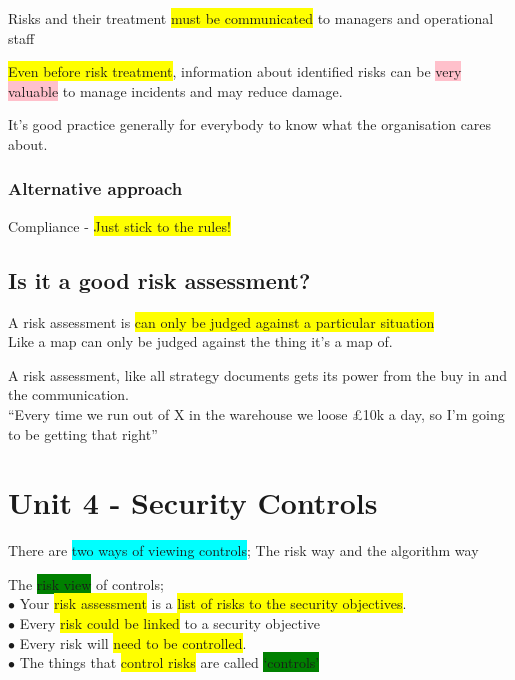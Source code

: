 \documentclass[tikz,border=10pt]{project_plan}
\newcommand{\bulletPoint}{\hspace{-3.1pt}$\bullet$ \hspace{5pt}}
\begin{document}
Risks and their treatment \colorbox{yellow}{must be communicated} to managers and operational staff

\colorbox{yellow}{Even before risk treatment}, information about identified risks can be \colorbox{pink}{very
  valuable} to manage incidents and may reduce damage.

It’s good practice generally for everybody to know what the organisation cares about.

\subsection{Alternative approach}

Compliance - \colorbox{yellow}{Just stick to the rules!}

\section{Is it a good risk assessment?}

A risk assessment is \colorbox{yellow}{can only be judged against a particular situation}\\
Like a map can only be judged against the thing it’s a map of.

A risk assessment, like all strategy documents gets its power from the buy in and the communication. \\
“Every time we run out of X in the warehouse we loose £10k a day, so I’m going to be getting that right”

\chapter{Unit 4 - Security Controls}

There are \colorbox{cyan}{two ways of viewing controls}; The risk way and the algorithm way

The \colorbox{green}{risk view} of controls;\\
\bulletPoint Your \colorbox{yellow}{risk assessment} is a \colorbox{yellow}{list of risks to the security objectives}.\\
\bulletPoint Every \colorbox{yellow}{risk could be linked} to a security objective\\
\bulletPoint Every risk will \colorbox{yellow}{need to be controlled}.\\
\bulletPoint The things that \colorbox{yellow}{control risks} are called \colorbox{green}{‘controls’}
\end{document}
